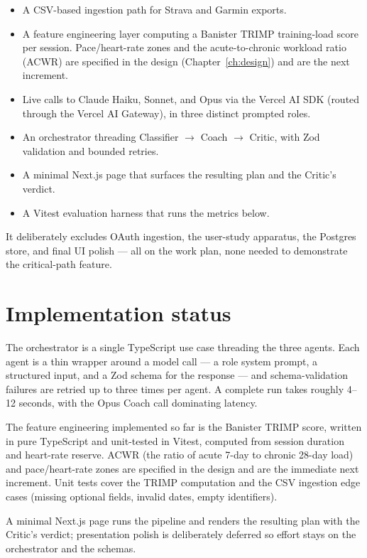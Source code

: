 \begin{itemize}
  \item A CSV-based ingestion path for Strava and Garmin exports.
  \item A feature engineering layer computing a Banister TRIMP training-load score per session. Pace/heart-rate zones and the acute-to-chronic workload ratio (ACWR) are specified in the design (Chapter~\ref{ch:design}) and are the next increment.
  \item Live calls to Claude Haiku, Sonnet, and Opus via the Vercel AI SDK (routed through the Vercel AI Gateway), in three distinct prompted roles.
  \item An orchestrator threading Classifier $\to$ Coach $\to$ Critic, with Zod validation and bounded retries.
  \item A minimal Next.js page that surfaces the resulting plan and the Critic's verdict.
  \item A Vitest evaluation harness that runs the metrics below.
\end{itemize}

It deliberately excludes OAuth ingestion, the user-study apparatus, the Postgres store, and final UI polish --- all on the work plan, none needed to demonstrate the critical-path feature.

\section{Implementation status}

The orchestrator is a single TypeScript use case threading the three agents. Each agent is a thin wrapper around a model call --- a role system prompt, a structured input, and a Zod schema for the response --- and schema-validation failures are retried up to three times per agent. A complete run takes roughly 4--12 seconds, with the Opus Coach call dominating latency.

The feature engineering implemented so far is the Banister TRIMP score, written in pure TypeScript and unit-tested in Vitest, computed from session duration and heart-rate reserve. ACWR (the ratio of acute 7-day to chronic 28-day load) and pace/heart-rate zones are specified in the design and are the immediate next increment. Unit tests cover the TRIMP computation and the CSV ingestion edge cases (missing optional fields, invalid dates, empty identifiers).

A minimal Next.js page runs the pipeline and renders the resulting plan with the Critic's verdict; presentation polish is deliberately deferred so effort stays on the orchestrator and the schemas.

